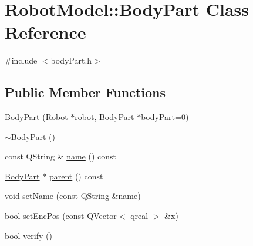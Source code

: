\hypertarget{class_robot_model_1_1_body_part}{
\section{RobotModel::BodyPart Class Reference}
\label{class_robot_model_1_1_body_part}
}


{\ttfamily \#include $<$bodyPart.h$>$}\subsection*{Public Member Functions}
\begin{DoxyCompactItemize}
\item 
\hyperlink{class_robot_model_1_1_body_part_a1f6265932a76d89dc77b0b6185966913}{BodyPart} (\hyperlink{class_robot_model_1_1_robot}{Robot} $\ast$robot, \hyperlink{class_robot_model_1_1_body_part}{BodyPart} $\ast$bodyPart=0)
\item 
\hyperlink{class_robot_model_1_1_body_part_a0d51eaacbf15745175b21bf44f67a92a}{$\sim$BodyPart} ()
\item 
const QString \& \hyperlink{class_robot_model_1_1_body_part_a61b6e309edb55f764400dac2b8659a5f}{name} () const 
\item 
\hyperlink{class_robot_model_1_1_body_part}{BodyPart} $\ast$ \hyperlink{class_robot_model_1_1_body_part_abc2ab2a0e1da50aa7465bc1b92ed3abc}{parent} () const 
\item 
void \hyperlink{class_robot_model_1_1_body_part_ae67c833c817776f9b922d967a2654df2}{setName} (const QString \&name)
\item 
bool \hyperlink{class_robot_model_1_1_body_part_adc934dcfdac5a14fe88dd5a21b9055d7}{setEncPos} (const QVector$<$ qreal $>$ \&x)
\item 
bool \hyperlink{class_robot_model_1_1_body_part_a6b52676f58b9da5bef87ef2fac1a7a94}{verify} ()
\end{DoxyCompactItemize}


